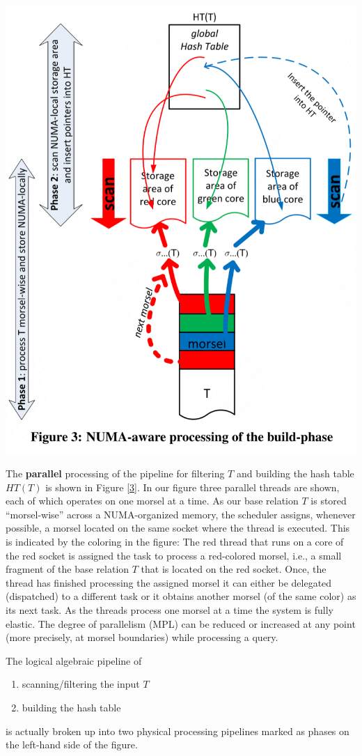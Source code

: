 \documentclass[11pt]{article}
\begin{document}
\begin{center}
\includegraphics[width=.7\textwidth]{../../images/papers/65.png}
\label{3}
\end{center}
The \textbf{parallel} processing of the pipeline for filtering \(T\) and building the hash table \(HT(T)\) is
shown in Figure \ref{3}. In our figure three parallel threads are shown, each of which operates on one
morsel at a time. As our base relation \(T\) is stored “morsel-wise” across a NUMA-organized memory,
the scheduler assigns, whenever possible, a morsel located on the same socket where the thread is
executed. This is indicated by the coloring in the figure: The red thread that runs on a core of the
red socket is assigned the task to process a red-colored morsel, i.e., a small fragment of the base
relation \(T\) that is located on the red socket. Once, the thread has finished processing the
assigned morsel it can either be delegated (dispatched) to a different task or it obtains another
morsel (of the same color) as its next task. As the threads process one morsel at a time the system is
fully elastic. The degree of  parallelism (MPL) can be reduced or increased at any point (more
precisely, at morsel boundaries) while processing a query.

The logical algebraic pipeline of
\begin{enumerate}
\item scanning/filtering the input \(T\)
\item building the hash table
\end{enumerate}
is actually broken up into two physical processing pipelines marked as phases on the left-hand side of
the figure.
\end{document}

